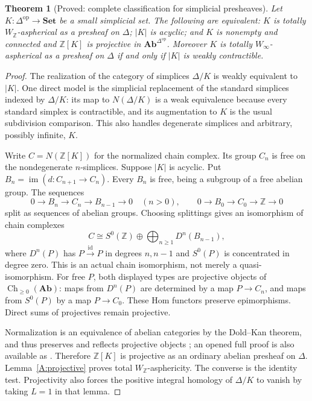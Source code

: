 \documentclass[11pt,a4paper]{article}
\newtheorem{theorem}{Theorem}[section]
\theoremstyle{definition}
\theoremstyle{remark}
\newcommand{\Set}{\mathbf{Set}}
\newcommand{\Ab}{\mathbf{Ab}}
\newcommand{\Z}{\mathbb Z}
\newcommand{\op}{\mathrm{op}}
\newcommand{\id}{\mathrm{id}}
\newcommand{\Winfty}{W_\infty}
\newcommand{\WZ}{W_{\mathbb Z}}
\newcommand{\im}{\operatorname{im}}
\newcommand{\Ch}{\operatorname{Ch}}
\begin{document}
\begin{theorem}[Proved: complete classification for simplicial presheaves]\label{A:simplicial}
Let $K:\Delta^{\op}\to\Set$ be a small simplicial set. The following are equivalent: $K$ is totally $\WZ$-aspherical as a presheaf on $\Delta$; $|K|$ is acyclic; and $K$ is nonempty and connected and $\Z[K]$ is projective in $\Ab^{\Delta^{\op}}$. Moreover $K$ is totally $\Winfty$-aspherical as a presheaf on $\Delta$ if and only if $|K|$ is weakly contractible.
\end{theorem}
\begin{proof}
The realization of the category of simplices $\Delta/K$ is weakly equivalent to $|K|$. One direct model is the simplicial replacement of the standard simplices indexed by $\Delta/K$: its map to $N(\Delta/K)$ is a weak equivalence because every standard simplex is contractible, and its augmentation to $K$ is the usual subdivision comparison. This also handles degenerate simplices and arbitrary, possibly infinite, $K$.

Write $C=N(\Z[K])$ for the normalized chain complex. Its group $C_n$ is free on the nondegenerate $n$-simplices. Suppose $|K|$ is acyclic. Put $B_n=\im(d:C_{n+1}\to C_n)$. Every $B_n$ is free, being a subgroup of a free abelian group. The sequences
\[
 0\to B_n\to C_n\to B_{n-1}\to0\quad(n>0),
 \qquad 0\to B_0\to C_0\to\Z\to0
\]
split as sequences of abelian groups. Choosing splittings gives an isomorphism of chain complexes
\[
 C\cong S^0(\Z)\oplus\bigoplus_{n\geq1}D^n(B_{n-1}),
\]
where $D^n(P)$ has $P\xrightarrow{\id}P$ in degrees $n,n-1$ and $S^0(P)$ is concentrated in degree zero. This is an actual chain isomorphism, not merely a quasi-isomorphism. For free $P$, both displayed types are projective objects of $\Ch_{\geq0}(\Ab)$: maps from $D^n(P)$ are determined by a map $P\to C_n$, and maps from $S^0(P)$ by a map $P\to C_0$. These Hom functors preserve epimorphisms. Direct sums of projectives remain projective.

Normalization is an equivalence of abelian categories by the Dold--Kan theorem, and thus preserves and reflects projective objects \citep[Theorem 8.4.1]{Weibel1994}; an opened full proof is also available as \citet[Theorem 14.24.3, Tag 019D]{StacksDK}. Therefore $\Z[K]$ is projective as an ordinary abelian presheaf on $\Delta$. Lemma~\ref{A:projective} proves total $\WZ$-asphericity. The converse is the identity test. Projectivity also forces the positive integral homology of $\Delta/K$ to vanish by taking $L=1$ in that lemma.


\end{proof}
\end{document}
